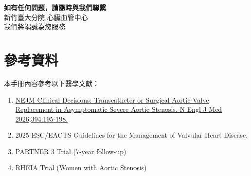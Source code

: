 \documentclass[12pt,a4paper]{article}
\begin{document}
\vspace{1cm}

\begin{center}
\begin{tcolorbox}[colback=emergency_blue!10, colframe=emergency_blue, arc=15pt, boxrule=2pt,
    width=0.9\textwidth]
\begin{center}
{\Large\bfseries\textcolor{emergency_blue}{如有任何問題，請隨時與我們聯繫}}\\[0.5cm]
{\large 新竹臺大分院 心臟血管中心}\\[0.3cm]
我們將竭誠為您服務
\end{center}
\end{tcolorbox}
\end{center}

\vspace{1cm}

\section*{\textcolor{emergency_gray}{\normalsize 參考資料}}

{\small
本手冊內容參考以下醫學文獻：
\begin{enumerate}[leftmargin=*]
    \item \href{https://doi.org/10.1056/NEJMclde2416168}{NEJM Clinical Decisions: Transcatheter or Surgical Aortic-Valve Replacement in Asymptomatic Severe Aortic Stenosis. N Engl J Med 2026;394:195-198.}
    \item 2025 ESC/EACTS Guidelines for the Management of Valvular Heart Disease.
    \item PARTNER 3 Trial (7-year follow-up)
    \item RHEIA Trial (Women with Aortic Stenosis)
\end{enumerate}
}
\end{document}
